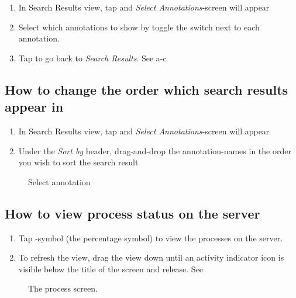 \begin{enumerate}
\item In Search Results view, tap  and \emph{Select Annotations}-screen will appear
\item Select which annotations to show by toggle the switch next to each annotation.
\item Tap  to go back to \emph{Search Results}. See a-c
\end{enumerate}

\subsection{How to change the order which search results appear in}

\begin{enumerate}
\item In Search Results view, tap  and \emph{Select Annotations}-screen will appear
\item Under the \emph{Sort by} header, drag-and-drop the annotation-names in the order you wish to sort the search result
\end{enumerate}

\begin{figure}[ht]
\caption{Select annotation}
\label{fig:ios_searchResult}
\end{figure}
\FloatBarrier

\subsection{How to view process status on the server}

\begin{enumerate}
\item Tap -symbol (the percentage symbol) to view the processes on the server.
\item To refresh the view, drag the view down until an activity indicator icon is visible below the title of the screen and release. See 
\end{enumerate}

\begin{figure}[htb]
\caption{The process screen.}
\label{fig:ios_processes}
\end{figure}
\FloatBarrier


